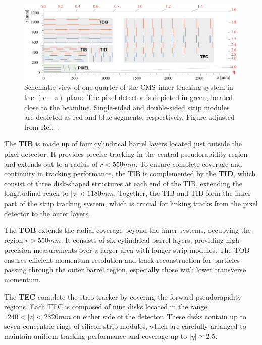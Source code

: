 \begin{figure}[h]
\centering
\includegraphics[width=1\textwidth]{Figures/Chapter3/Phase1_Tracker.pdf}
\caption{Schematic view of one-quarter of the CMS inner tracking system in the $(r-z)$ plane. The pixel detector is depicted in green, located close to the beamline. Single-sided and double-sided strip modules are depicted as red and blue segments, respectively. Figure adjusted from Ref.~\cite{CMS_Detector_Run3}.}
\label{Figure:Chapter3_Tracker_Geometry}
\end{figure}

The \textbf{TIB} is made up of four cylindrical barrel layers located just outside the pixel detector. It provides precise tracking in the central pseudorapidity region and extends out to a radius of $r < 550\unit{mm}$. To ensure complete coverage and continuity in tracking performance, the TIB is complemented by the \textbf{TID}, which consist of three disk-shaped structures at each end of the TIB, extending the longitudinal reach to $|z| < 1180\unit{mm}$. Together, the TIB and TID form the inner part of the strip tracking system, which is crucial for linking tracks from the pixel detector to the outer layers.

The \textbf{TOB} extends the radial coverage beyond the inner systems, occupying the region $r > 550\unit{mm}$. It consists of six cylindrical barrel layers, providing high-precision measurements over a larger area with longer strip modules. The TOB ensures efficient momentum resolution and track reconstruction for particles passing through the outer barrel region, especially those with lower transverse momentum.

The \textbf{TEC} complete the strip tracker by covering the forward pseudorapidity regions. Each TEC is composed of nine disks located in the range $1240 < |z| < 2820\unit{mm}$ on either side of the detector. These disks contain up to seven concentric rings of silicon strip modules, which are carefully arranged to maintain uniform tracking performance and coverage up to $|\eta| \simeq 2.5$.

